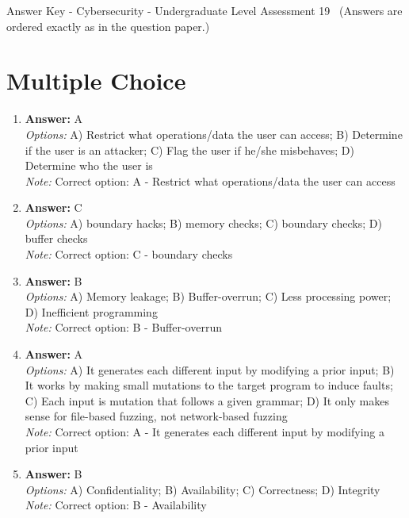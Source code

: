 \documentclass[12pt]{article}
\begin{document}
\begin{center}
Answer Key - Cybersecurity - Undergraduate Level Assessment 19 \
\small (Answers are ordered exactly as in the question paper.)
\end{center}

\section*{Multiple Choice}
\begin{enumerate}[label=\arabic*.]
\item \textbf{Answer:} A
\\ \textit{Options:} A) Restrict what operations/data the user can access; B) Determine if the user is an attacker; C) Flag the user if he/she misbehaves; D) Determine who the user is
\\ \textit{Note:} Correct option: A - Restrict what operations/data the user can access
\item \textbf{Answer:} C
\\ \textit{Options:} A) boundary hacks; B) memory checks; C) boundary checks; D) buffer checks
\\ \textit{Note:} Correct option: C - boundary checks
\item \textbf{Answer:} B
\\ \textit{Options:} A) Memory leakage; B) Buffer-overrun; C) Less processing power; D) Inefficient programming
\\ \textit{Note:} Correct option: B - Buffer-overrun
\item \textbf{Answer:} A
\\ \textit{Options:} A) It generates each different input by modifying a prior input; B) It works by making small mutations to the target program to induce faults; C) Each input is mutation that follows a given grammar; D) It only makes sense for file-based fuzzing, not network-based fuzzing
\\ \textit{Note:} Correct option: A - It generates each different input by modifying a prior input
\item \textbf{Answer:} B
\\ \textit{Options:} A) Confidentiality; B) Availability; C) Correctness; D) Integrity
\\ \textit{Note:} Correct option: B - Availability
\end{enumerate}
\end{document}
